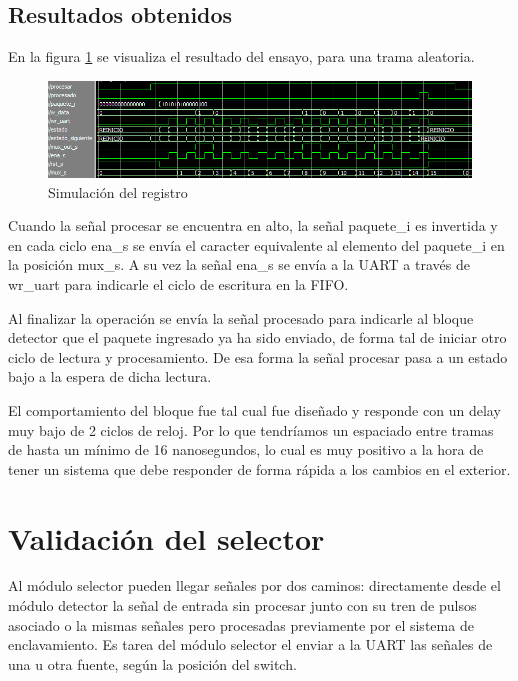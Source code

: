 	\subsection{Resultados obtenidos}
				
		En la figura \ref{fig:Test_Registro} se visualiza el resultado del ensayo, para una trama aleatoria.
		
	\begin{figure}[h]
	\centering
	\includegraphics[scale=0.6]{./Figures/Test/Registro}
		\caption{Simulación del registro}
		\label{fig:Test_Registro}
	\end{figure}
	
	Cuando la señal procesar se encuentra en alto, la señal paquete\_i es invertida y en cada ciclo ena\_s se envía el caracter equivalente al elemento del paquete\_i en la posición mux\_s. A su vez la señal ena\_s se envía a la UART a través de wr\_uart para indicarle el ciclo de escritura en la FIFO.
	
	Al finalizar la operación se envía la señal procesado para indicarle al bloque detector que el paquete ingresado ya ha sido enviado, de forma tal de iniciar otro ciclo de lectura y procesamiento. De esa forma la señal procesar pasa a un estado bajo a la espera de dicha lectura.
	
	El comportamiento del bloque fue tal cual fue diseñado y responde con un delay muy bajo de 2 ciclos de reloj. Por lo que tendríamos un espaciado entre tramas de hasta un mínimo de 16 nanosegundos, lo cual es muy positivo a la hora de tener un sistema que debe responder de forma rápida a los cambios en el exterior.	
	
\section{Validación del selector}

	Al módulo selector pueden llegar señales por dos caminos: directamente desde el módulo detector la señal de entrada sin procesar junto con su tren de pulsos asociado o la mismas señales pero procesadas previamente por el sistema de enclavamiento. Es tarea del módulo selector el enviar a la UART las señales de una u otra fuente, según la posición del switch.	
	
